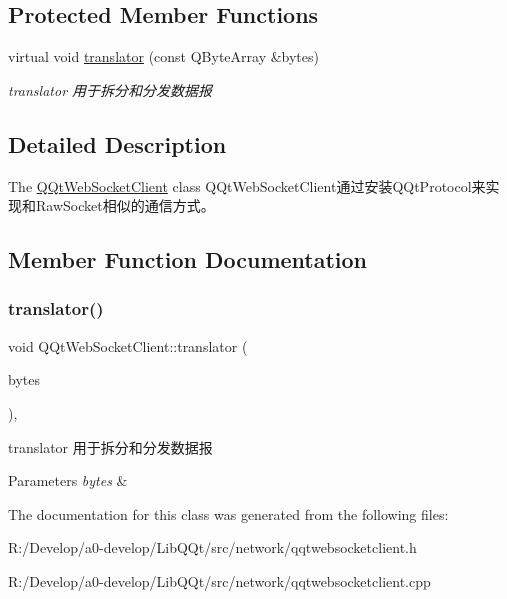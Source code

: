 \subsection*{Protected Member Functions}
\begin{DoxyCompactItemize}
\item 
virtual void \mbox{\hyperlink{class_q_qt_web_socket_client_aaf818de5921ddbe7f0acc761dbf5fc2c}{translator}} (const Q\+Byte\+Array \&bytes)
\begin{DoxyCompactList}\small\item\em translator 用于拆分和分发数据报 \end{DoxyCompactList}\end{DoxyCompactItemize}


\subsection{Detailed Description}
The \mbox{\hyperlink{class_q_qt_web_socket_client}{Q\+Qt\+Web\+Socket\+Client}} class Q\+Qt\+Web\+Socket\+Client通过安装\+Q\+Qt\+Protocol来实现和\+Raw\+Socket相似的通信方式。 

\subsection{Member Function Documentation}
\mbox{\label{class_q_qt_web_socket_client_aaf818de5921ddbe7f0acc761dbf5fc2c}} 
\subsubsection{\texorpdfstring{translator()}{translator()}}
{\footnotesize\ttfamily void Q\+Qt\+Web\+Socket\+Client\+::translator (\begin{DoxyParamCaption}\item[{const Q\+Byte\+Array \&}]{bytes }\end{DoxyParamCaption})\hspace{0.3cm}{\ttfamily [protected]}, {\ttfamily [virtual]}}



translator 用于拆分和分发数据报 


\begin{DoxyParams}{Parameters}
{\em bytes} & \\
\hline
\end{DoxyParams}


The documentation for this class was generated from the following files\+:\begin{DoxyCompactItemize}
\item 
R\+:/\+Develop/a0-\/develop/\+Lib\+Q\+Qt/src/network/qqtwebsocketclient.\+h\item 
R\+:/\+Develop/a0-\/develop/\+Lib\+Q\+Qt/src/network/qqtwebsocketclient.\+cpp\end{DoxyCompactItemize}
